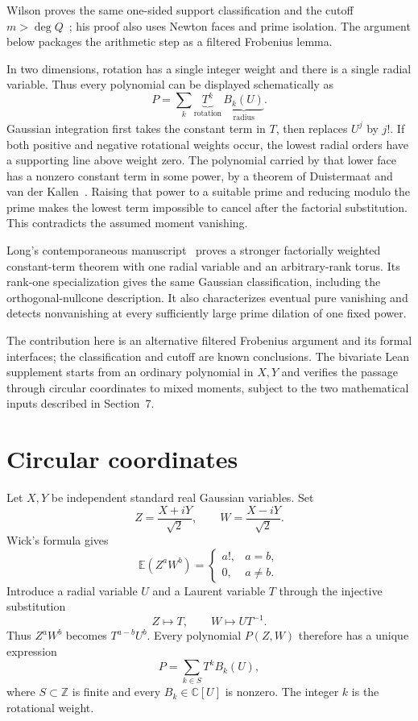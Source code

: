 \documentclass[11pt]{article}
\newcommand{\C}{\mathbb C}
\newcommand{\Z}{\mathbb Z}
\newcommand{\E}{\mathbb E}
\begin{document}
Wilson proves the same one-sided support classification and
the cutoff \(m>\deg Q\)~\cite[Theorem~1]{Wilson}; his proof also uses Newton faces
and prime isolation.  The argument below packages the arithmetic step as
a filtered Frobenius lemma.

In two
dimensions, rotation has a single integer weight and there is a single
radial variable.  Thus every polynomial can be displayed schematically as
\[
  P=\sum_k \underbrace{T^k}_{\text{rotation}}\,
                  \underbrace{B_k(U)}_{\text{radius}}.
\]
Gaussian integration first takes the constant term in \(T\), then replaces
\(U^j\) by \(j!\).  If both positive and negative rotational weights occur,
the lowest radial orders have a supporting line above weight zero.  The
polynomial carried by that lower face has a nonzero constant term in some
power, by a theorem of Duistermaat and van der Kallen~\cite{DK}.  Raising
that power to a suitable prime and reducing modulo the prime makes the
lowest term impossible to cancel after the factorial substitution.  This
contradicts the assumed moment vanishing.

Long's contemporaneous manuscript~\cite[Theorems~1.1--1.2]{LongTorus}
proves a stronger factorially weighted constant-term theorem with one radial
variable and an arbitrary-rank torus.  Its rank-one specialization gives
the same Gaussian classification, including the orthogonal-nullcone
description.  It also characterizes eventual pure vanishing and detects
nonvanishing at every sufficiently large prime dilation of one fixed power.

The contribution here is an alternative filtered Frobenius argument and
its formal interfaces; the classification and cutoff are known conclusions.
The bivariate Lean supplement starts from an ordinary polynomial in \(X,Y\)
and verifies the passage through circular coordinates to mixed moments,
subject to the two mathematical inputs described in Section~7.

\section{Circular coordinates}

Let \(X,Y\) be independent standard real Gaussian variables.  Set
\[
  Z=\frac{X+iY}{\sqrt2},\qquad
  W=\frac{X-iY}{\sqrt2}.
\]
Wick's formula gives
\begin{equation}\label{eq:wick}
  \E(Z^aW^b)=
  \begin{cases}
    a!,&a=b,\\
    0,&a\neq b.
  \end{cases}
\end{equation}
Introduce a radial variable \(U\) and a Laurent variable \(T\) through the
injective substitution
\[
  Z\longmapsto T,\qquad W\longmapsto UT^{-1}.
\]
Thus \(Z^aW^b\) becomes \(T^{a-b}U^b\).  Every polynomial \(P(Z,W)\)
therefore has a unique expression
\begin{equation}\label{eq:weight-decomposition}
  P=\sum_{k\in S}T^kB_k(U),
\end{equation}
where \(S\subset\Z\) is finite and every \(B_k\in\C[U]\) is nonzero.  The
integer \(k\) is the rotational weight.
\end{document}
